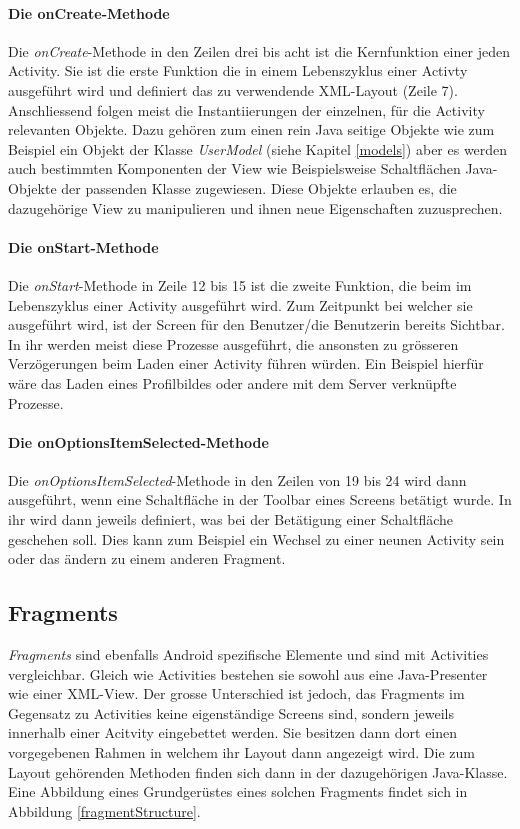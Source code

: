 \documentclass[../main.tex]{subfiles}
\begin{document}
	\paragraph{Die onCreate-Methode}
	Die \emph{onCreate}-Methode in den Zeilen drei bis acht ist die Kernfunktion einer jeden Activity. Sie ist die erste Funktion die in einem Lebenszyklus einer Activty ausgeführt wird und definiert das zu verwendende XML-Layout (Zeile 7). Anschliessend folgen meist die Instantiierungen der einzelnen, für die Activity relevanten Objekte. Dazu gehören zum einen rein Java seitige Objekte wie zum Beispiel ein Objekt der Klasse \emph{UserModel} (siehe Kapitel \ref{models}) aber es werden auch bestimmten Komponenten der View wie Beispielsweise Schaltflächen Java-Objekte der passenden Klasse zugewiesen. Diese Objekte erlauben es, die dazugehörige View zu manipulieren und ihnen neue Eigenschaften zuzusprechen.

	\paragraph{Die onStart-Methode}
	Die \emph{onStart}-Methode in Zeile 12 bis 15 ist die zweite Funktion, die beim im Lebenszyklus einer Activity ausgeführt wird. Zum Zeitpunkt bei welcher sie ausgeführt wird, ist der Screen für den Benutzer/die Benutzerin bereits Sichtbar. In ihr werden meist diese Prozesse ausgeführt, die ansonsten zu grösseren Verzögerungen beim Laden einer Activity führen würden. Ein Beispiel hierfür wäre das Laden eines Profilbildes oder andere mit dem Server verknüpfte Prozesse.
	
	\paragraph{Die onOptionsItemSelected-Methode}
	Die \emph{onOptionsItemSelected}-Methode in den Zeilen von 19 bis 24 wird dann ausgeführt, wenn eine Schaltfläche in der Toolbar eines Screens betätigt wurde. In ihr wird dann jeweils definiert, was bei der Betätigung einer Schaltfläche geschehen soll. Dies kann zum Beispiel ein Wechsel zu einer neunen Activity sein oder das ändern zu einem anderen Fragment.
	
	\subsection{Fragments}
	\emph{Fragments} sind ebenfalls Android spezifische Elemente und sind mit Activities vergleichbar. Gleich wie Activities bestehen sie sowohl aus eine Java-Presenter wie einer XML-View. Der grosse Unterschied ist jedoch, das Fragments im Gegensatz zu Activities keine eigenständige Screens sind, sondern jeweils innerhalb einer Acitvity eingebettet werden. Sie besitzen dann dort einen vorgegebenen Rahmen in welchem ihr Layout dann angezeigt wird. Die zum Layout gehörenden Methoden finden sich dann in der dazugehörigen Java-Klasse. Eine Abbildung eines Grundgerüstes eines solchen Fragments findet sich in Abbildung \ref{fragmentStructure}.
	
\end{document}
